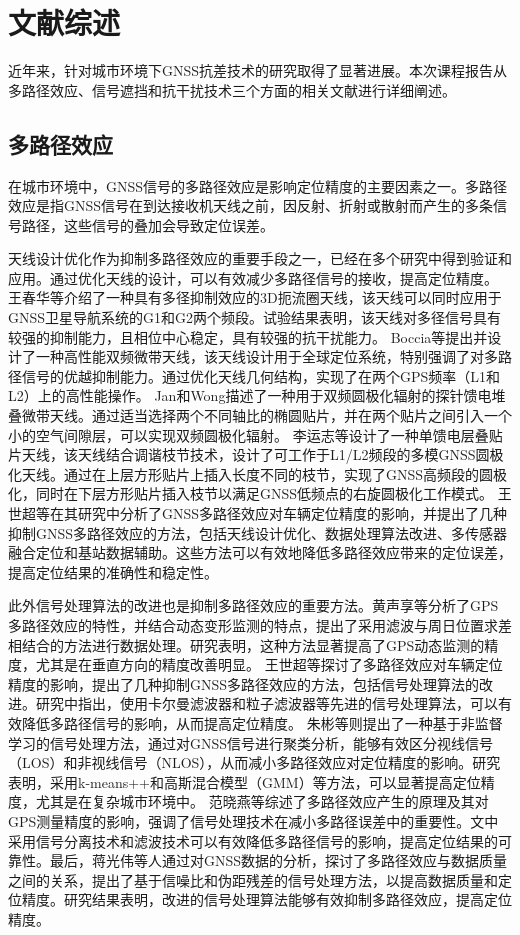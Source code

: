 \documentclass[12pt,hyperref,a4paper,UTF8]{ctexart}
\begin{document}
\section{文献综述}
近年来，针对城市环境下GNSS抗差技术的研究取得了显著进展。本次课程报告从多路径效应、信号遮挡和抗干扰技术三个方面的相关文献进行详细阐述。

\subsection{多路径效应}
在城市环境中，GNSS信号的多路径效应是影响定位精度的主要因素之一\cite{fan2010}。多路径效应是指GNSS信号在到达接收机天线之前，因反射、折射或散射而产生的多条信号路径，这些信号的叠加会导致定位误差。

天线设计优化作为抑制多路径效应的重要手段之一，已经在多个研究中得到验证和应用。通过优化天线的设计，可以有效减少多路径信号的接收，提高定位精度。
王春华等\cite{wang2014}介绍了一种具有多径抑制效应的3D扼流圈天线，该天线可以同时应用于GNSS卫星导航系统的G1和G2两个频段。试验结果表明，该天线对多径信号具有较强的抑制能力，且相位中心稳定，具有较强的抗干扰能力。
Boccia等\cite{boccia2001}提出并设计了一种高性能双频微带天线，该天线设计用于全球定位系统，特别强调了对多路径信号的优越抑制能力。通过优化天线几何结构，实现了在两个GPS频率（L1和L2）上的高性能操作。
Jan和Wong\cite{jan2000}描述了一种用于双频圆极化辐射的探针馈电堆叠微带天线。通过适当选择两个不同轴比的椭圆贴片，并在两个贴片之间引入一个小的空气间隙层，可以实现双频圆极化辐射。
李运志等\cite{li2011}设计了一种单馈电层叠贴片天线，该天线结合调谐枝节技术，设计了可工作于L1/L2频段的多模GNSS圆极化天线。通过在上层方形贴片上插入长度不同的枝节，实现了GNSS高频段的圆极化，同时在下层方形贴片插入枝节以满足GNSS低频点的右旋圆极化工作模式。
王世超等\cite{wang2013}在其研究中分析了GNSS多路径效应对车辆定位精度的影响，并提出了几种抑制GNSS多路径效应的方法，包括天线设计优化、数据处理算法改进、多传感器融合定位和基站数据辅助。这些方法可以有效地降低多路径效应带来的定位误差，提高定位结果的准确性和稳定性。

此外信号处理算法的改进也是抑制多路径效应的重要方法。黄声享等\cite{huang2005}分析了GPS多路径效应的特性，并结合动态变形监测的特点，提出了采用滤波与周日位置求差相结合的方法进行数据处理。研究表明，这种方法显著提高了GPS动态监测的精度，尤其是在垂直方向的精度改善明显。
王世超等\cite{wang2013}探讨了多路径效应对车辆定位精度的影响，提出了几种抑制GNSS多路径效应的方法，包括信号处理算法的改进。研究中指出，使用卡尔曼滤波器和粒子滤波器等先进的信号处理算法，可以有效降低多路径信号的影响，从而提高定位精度。
朱彬等\cite{zhu2021}则提出了一种基于非监督学习的信号处理方法，通过对GNSS信号进行聚类分析，能够有效区分视线信号（LOS）和非视线信号（NLOS），从而减小多路径效应对定位精度的影响。研究表明，采用k-means++和高斯混合模型（GMM）等方法，可以显著提高定位精度，尤其是在复杂城市环境中。
范晓燕等\cite{fan2010zhou}综述了多路径效应产生的原理及其对GPS测量精度的影响，强调了信号处理技术在减小多路径误差中的重要性。文中采用信号分离技术和滤波技术可以有效降低多路径信号的影响，提高定位结果的可靠性。最后，蒋光伟等人通过对GNSS数据的分析，探讨了多路径效应与数据质量之间的关系，提出了基于信噪比和伪距残差的信号处理方法，以提高数据质量和定位精度。研究结果表明，改进的信号处理算法能够有效抑制多路径效应，提高定位精度\cite{jiang2018}。
\end{document}
